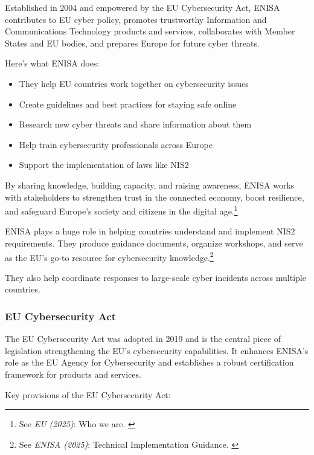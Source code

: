 Established in 2004 and empowered by the EU Cybersecurity Act, ENISA contributes to EU cyber policy, promotes trustworthy Information and Communications Technology products and services, collaborates with Member States and EU bodies, and prepares Europe for future cyber threats. 

Here's what ENISA does:

\begin{itemize}
    \item They help EU countries work together on cybersecurity issues
    \item Create guidelines and best practices for staying safe online
    \item Research new cyber threats and share information about them
    \item Help train cybersecurity professionals across Europe
    \item Support the implementation of laws like NIS2
\end{itemize}

By sharing knowledge, building capacity, and raising awareness, ENISA works with stakeholders to strengthen trust in the connected economy, boost resilience, and safeguard Europe's society and citizens in the digital age.\footnote{See \textit{EU (2025)}: Who we are. \cite{aboutEnisa}}

ENISA plays a huge role in helping countries understand and implement NIS2 requirements. They produce guidance documents, organize workshops, and serve as the EU's go-to resource for cybersecurity knowledge.\footnote{See \textit{ENISA (2025)}: Technical Implementation Guidance. \cite{enisaTech}}

They also help coordinate responses to large-scale cyber incidents across multiple countries.

\subsubsection{EU Cybersecurity Act}

The EU Cybersecurity Act was adopted in 2019 and is the central piece of legislation strengthening the EU's cybersecurity capabilities. It enhances ENISA's role as the EU Agency for Cybersecurity and establishes a robust certification framework for products and services.

Key provisions of the EU Cybersecurity Act:

